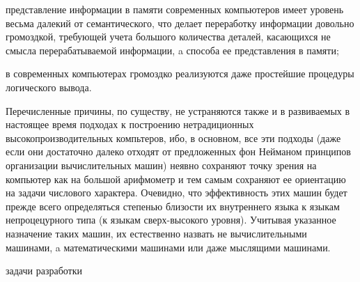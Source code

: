 \begin{scnsubstruct}
{\begin{scnitemize}
			\item представление информации в памяти современных компьютеров имеет уровень весьма далекий от семантического, что делает переработку информации довольно громоздкой, требующей учета большого количества деталей, касающихся не смысла перерабатываемой информации, a способа ее представления в памяти;
			\item в современных компьютерах громоздко реализуются даже простейшие процедуры логического вывода.
		\end{scnitemize}
		Перечисленные причины, по существу, не устраняются также и в развиваемых в настоящее время подходах к построению нетрадиционных высокопроизводительных компьтеров, ибо, в основном, все эти подходы (даже если они достаточно далеко отходят от предложенных фон Нейманом принципов организации вычислительных машин) неявно сохраняют точку зрения на компьютер как на большой арифмометр и тем самым сохраняют ее ориентацию на задачи числового характера. Очевидно, что эффективность этих машин будет прежде всего определяться степенью близости их внутреннего языка к языкам непроцецурного типа (к языкам сверх-высокого уровня). Учитывая указанное назначение таких машин, их естественно назвать не вычислительными машинами, a математическими машинами или даже мыслящими машинами.}
	\begin{scnrelfromset}{задачи разработки}

\end{scnrelfromset}
\end{scnsubstruct}
